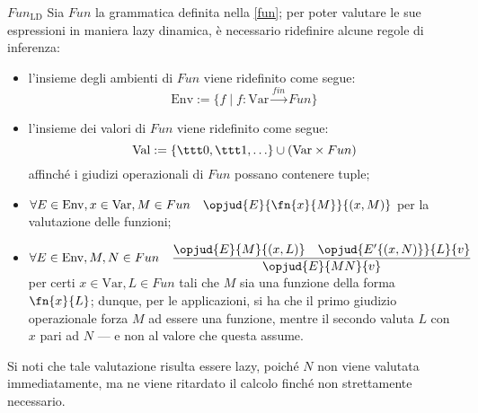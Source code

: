 \documentclass[a4paper, 12pt]{report}
\begin{document}
    \begin{framedprop}[breakable]{$Fun_\mathrm{LD}$}
        Sia $Fun$ la grammatica definita nella \cref{fun}; per poter valutare le sue espressioni in maniera lazy dinamica, è necessario ridefinire alcune regole di inferenza:

        \begin{itemize}
            \item l'insieme degli ambienti di $Fun$ viene ridefinito come segue: $$\mathrm{Env} := \{ f \mid f: \mathrm{Var} \xrightarrow{fin} Fun \}$$
            \item l'insieme dei valori di $Fun$ viene ridefinito come segue: $$\mathrm{Val} := \{ \ttt 0, \ttt 1, \ldots \} \cup (\mathrm{Var} \times Fun)$$ affinché i giudizi operazionali di $Fun$ possano contenere tuple;
            \item $\forall E \in \mathrm{Env}, x \in \mathrm{Var}, M \in Fun \quad \opjud{E}{\fn{x}{M}}{(x,M)}$ per la valutazione delle funzioni;
            \item $\forall E \in \mathrm{Env}, M,N \in Fun \quad \dfrac{\opjud{E}{M}{(x,L)} \quad \opjud{E'\{(x,N)\}}{L}{v}}{\opjud{E}{MN}{v}}$ per certi $x \in \mathrm{Var}, L \in Fun$ tali che $M$ sia una funzione della forma $\fn{x}{L}$; dunque, per le applicazioni, si ha che il primo giudizio operazionale forza $M$ ad essere una funzione, mentre il secondo valuta $L$ con $x$ pari ad $N$ --- e non al valore che questa assume.
        \end{itemize}

        Si noti che tale valutazione risulta essere lazy, poiché $N$ non viene valutata immediatamente, ma ne viene ritardato il calcolo finché non strettamente necessario.
    \end{framedprop}
\end{document}
